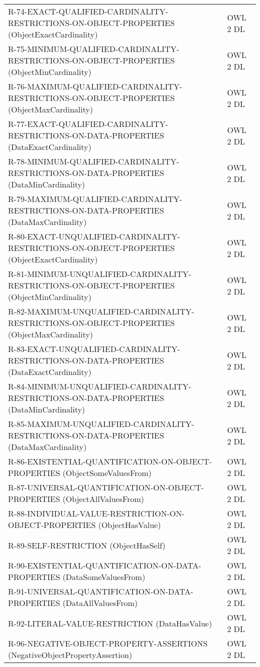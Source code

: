 \documentclass{llncs}
\begin{document}
\begin{table}
\begin{tabular}{ll}
R-74-EXACT-QUALIFIED-CARDINALITY-RESTRICTIONS-ON-OBJECT-PROPERTIES (ObjectExactCardinality) & OWL 2 DL \\
R-75-MINIMUM-QUALIFIED-CARDINALITY-RESTRICTIONS-ON-OBJECT-PROPERTIES (ObjectMinCardinality) & OWL 2 DL \\
R-76-MAXIMUM-QUALIFIED-CARDINALITY-RESTRICTIONS-ON-OBJECT-PROPERTIES (ObjectMaxCardinality) & OWL 2 DL \\
R-77-EXACT-QUALIFIED-CARDINALITY-RESTRICTIONS-ON-DATA-PROPERTIES (DataExactCardinality) & OWL 2 DL \\
R-78-MINIMUM-QUALIFIED-CARDINALITY-RESTRICTIONS-ON-DATA-PROPERTIES (DataMinCardinality) & OWL 2 DL \\
R-79-MAXIMUM-QUALIFIED-CARDINALITY-RESTRICTIONS-ON-DATA-PROPERTIES (DataMaxCardinality) & OWL 2 DL \\
R-80-EXACT-UNQUALIFIED-CARDINALITY-RESTRICTIONS-ON-OBJECT-PROPERTIES (ObjectExactCardinality) & OWL 2 DL \\
R-81-MINIMUM-UNQUALIFIED-CARDINALITY-RESTRICTIONS-ON-OBJECT-PROPERTIES (ObjectMinCardinality) & OWL 2 DL \\
R-82-MAXIMUM-UNQUALIFIED-CARDINALITY-RESTRICTIONS-ON-OBJECT-PROPERTIES (ObjectMaxCardinality) & OWL 2 DL \\
R-83-EXACT-UNQUALIFIED-CARDINALITY-RESTRICTIONS-ON-DATA-PROPERTIES (DataExactCardinality) & OWL 2 DL \\
R-84-MINIMUM-UNQUALIFIED-CARDINALITY-RESTRICTIONS-ON-DATA-PROPERTIES (DataMinCardinality) & OWL 2 DL \\
R-85-MAXIMUM-UNQUALIFIED-CARDINALITY-RESTRICTIONS-ON-DATA-PROPERTIES (DataMaxCardinality) & OWL 2 DL \\
R-86-EXISTENTIAL-QUANTIFICATION-ON-OBJECT-PROPERTIES (ObjectSomeValuesFrom) & OWL 2 DL \\
R-87-UNIVERSAL-QUANTIFICATION-ON-OBJECT-PROPERTIES (ObjectAllValuesFrom) & OWL 2 DL \\
R-88-INDIVIDUAL-VALUE-RESTRICTION-ON-OBJECT-PROPERTIES (ObjectHasValue) & OWL 2 DL \\
R-89-SELF-RESTRICTION (ObjectHasSelf) & OWL 2 DL \\
R-90-EXISTENTIAL-QUANTIFICATION-ON-DATA-PROPERTIES (DataSomeValuesFrom) & OWL 2 DL \\
R-91-UNIVERSAL-QUANTIFICATION-ON-DATA-PROPERTIES (DataAllValuesFrom) & OWL 2 DL \\
R-92-LITERAL-VALUE-RESTRICTION (DataHasValue) & OWL 2 DL \\
R-96-NEGATIVE-OBJECT-PROPERTY-ASSERTIONS (NegativeObjectPropertyAssertion) & OWL 2 DL \\

\end{tabular}
\end{table}
\end{document}
